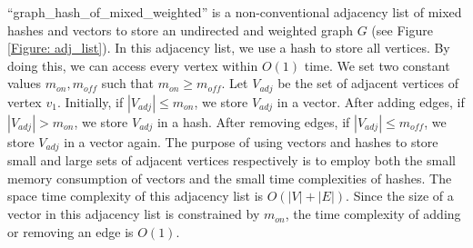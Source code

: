 \documentclass{vldb}
\begin{document}
\enquote{graph\_hash\_of\_mixed\_weighted} is a non-conventional adjacency list of mixed hashes and vectors to store an undirected and weighted graph $G$ (see Figure \ref{Figure: adj_list}). %
In this adjacency list, we use a hash to store all vertices. By doing this, we can access every vertex within $O(1)$ time. We set two constant values $m_{on},m_{off}$ such that $m_{on} \geq m_{off}$.  Let $V_{adj}$ be the set of adjacent vertices of vertex $v_1$. Initially, if $|V_{adj}| \leq m_{on}$, we store $V_{adj}$ in a vector. After adding edges, if $|V_{adj}| > m_{on}$, we store $V_{adj}$ in a hash. After removing edges, if $|V_{adj}| \leq m_{off}$, we store $V_{adj}$ in a vector again. The purpose of using vectors and hashes to store small and large sets of adjacent vertices respectively is to employ both the small memory consumption of vectors and the small time complexities of hashes. The space time complexity of this adjacency list is $O(|V|+|E|)$.  
Since the size of a vector in this adjacency list is constrained by $m_{on}$, the time complexity of adding or removing an edge is $O(1)$. 












%	
	
\end{document}

